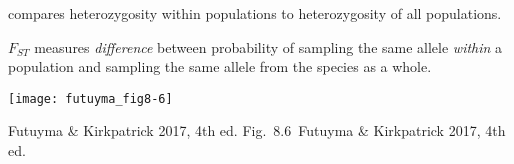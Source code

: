 \documentclass[t]{beamer}
\newcommand{\futuyma}[1]{%
	\ifthenelse{\isempty{#1}}%
	{Futuyma \& Kirkpatrick 2017, 4th ed.}%
	{Fig.~#1~Futuyma \& Kirkpatrick 2017, 4th ed.}%
}
\newcommand{\backskip}{\vspace{-0.5\baselineskip}}
\begin{document}
\begin{frame}{ compares heterozygosity within populations to heterozygosity of all populations.}

\backskip

\begin{multicols}{2}

\hangpara $F_{ST}$ measures \emph{difference} between probability of sampling the same allele \emph{within} a population and sampling the same allele from the species as a whole.





\columnbreak

\centering
\noindent\texttt{[image: futuyma\_fig8-6]}

\end{multicols}



\tinyfill \futuyma{8.6}

\end{frame}


%
%
%
%
%
\end{document}
